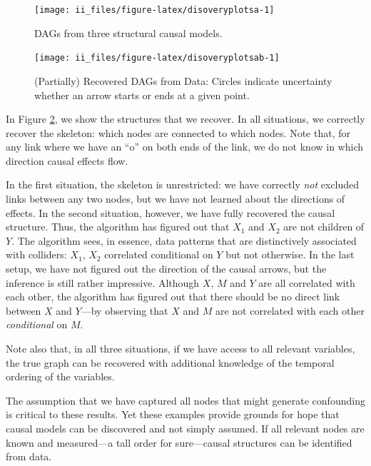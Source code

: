 \documentclass[
  12pt,
]{book}
\begin{document}
\begin{figure}

{\centering \texttt{[image: ii\_files/figure-latex/disoveryplotsa-1]} 

}

\caption{DAGs from three structural causal models.}\label{fig:disoveryplotsa}
\end{figure}

\begin{figure}

{\centering \texttt{[image: ii\_files/figure-latex/disoveryplotsab-1]} 

}

\caption{(Partially) Recovered DAGs from Data: Circles indicate uncertainty whether an arrow starts or ends at a given point.}\label{fig:disoveryplotsab}
\end{figure}

In Figure \ref{fig:disoveryplotsab}, we show the structures that we recover. In all situations, we correctly recover the skeleton: which nodes are connected to which nodes. Note that, for any link where we have an ``o'' on both ends of the link, we do not know in which direction causal effects flow.

In the first situation, the skeleton is unrestricted: we have correctly \emph{not} excluded links between any two nodes, but we have not learned about the directions of effects. In the second situation, however, we have fully recovered the causal structure. Thus, the algorithm has figured out that \(X_1\) and \(X_2\) are not children of \(Y\). The algorithm sees, in essence, data patterns that are distinctively associated with colliders: \(X_1\), \(X_2\) correlated conditional on \(Y\) but not otherwise. In the last setup, we have not figured out the direction of the causal arrows, but the inference is still rather impressive. Although \(X\), \(M\) and \(Y\) are all correlated with each other, the algorithm has figured out that there should be no direct link between \(X\) and \(Y\)---by observing that \(X\) and \(M\) are not correlated with each other \emph{conditional} on \(M\).

Note also that, in all three situations, if we have access to all relevant variables, the true graph can be recovered with additional knowledge of the temporal ordering of the variables.

The assumption that we have captured all nodes that might generate confounding is critical to these results. Yet these examples provide grounds for hope that causal models can be discovered and not simply assumed. If all relevant nodes are known and measured---a tall order for sure---causal structures can be identified from data.
\end{document}
